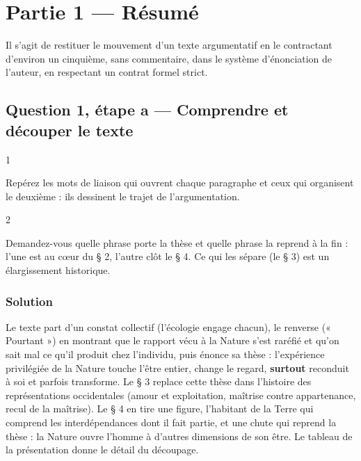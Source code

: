 \documentclass[11pt,a4paper]{article}
\begin{document}
\hypertarget{partie-1-ruxe9sumuxe9}{%
\section{Partie 1 --- Résumé}\label{partie-1-ruxe9sumuxe9}}

Il s'agit de restituer le mouvement d'un texte argumentatif en le contractant d'environ un cinquième, sans commentaire, dans le système d'énonciation de l'auteur, en respectant un contrat formel strict.

\hypertarget{question-1-uxe9tape-a-comprendre-et-duxe9couper-le-texte}{%
\subsection{Question 1, étape a --- Comprendre et découper le texte}\label{question-1-uxe9tape-a-comprendre-et-duxe9couper-le-texte}}

\begin{indication}{1}

Repérez les mots de liaison qui ouvrent chaque paragraphe et ceux qui organisent le deuxième : ils dessinent le trajet de l'argumentation.

\end{indication}

\begin{indication}{2}

Demandez-vous quelle phrase porte la thèse et quelle phrase la reprend à la fin : l'une est au cœur du § 2, l'autre clôt le § 4. Ce qui les sépare (le § 3) est un élargissement historique.

\end{indication}

\hypertarget{solution}{%
\subsubsection{Solution}\label{solution}}

Le texte part d'un constat collectif (l'écologie engage chacun), le renverse (« Pourtant ») en montrant que le rapport vécu à la Nature s'est raréfié et qu'on sait mal ce qu'il produit chez l'individu, puis énonce sa thèse : l'expérience privilégiée de la Nature touche l'être entier, change le regard, \textbf{surtout} reconduit à soi et parfois transforme. Le § 3 replace cette thèse dans l'histoire des représentations occidentales (amour et exploitation, maîtrise contre appartenance, recul de la maîtrise). Le § 4 en tire une figure, l'habitant de la Terre qui comprend les interdépendances dont il fait partie, et une chute qui reprend la thèse : la Nature ouvre l'homme à d'autres dimensions de son être. Le tableau de la présentation donne le détail du découpage.
\end{document}
